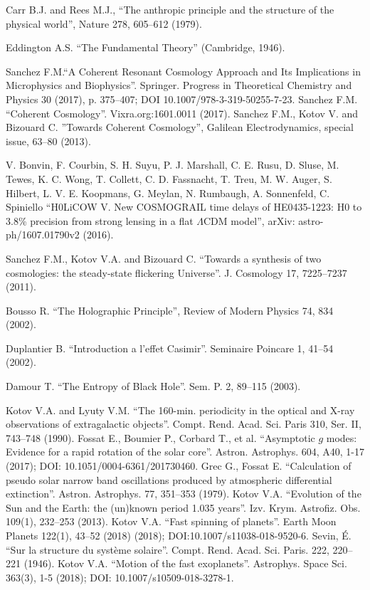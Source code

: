 \documentclass[twoside,draft]{article}
\begin{document}
\begin{sloppypar}
\begin{thebibliography}{99}\footnotesize

 Carr B.J. and Rees M.J., ``The anthropic principle and the
structure of the physical world'', Nature 278, 605--612 (1979).

 Eddington A.S. ``The Fundamental Theory'' (Cambridge, 1946).

 Sanchez F.M.``A Coherent Resonant Cosmology Approach and Its Implications in Microphysics and Biophysics''. Springer. Progress in Theoretical Chemistry and Physics 30 (2017), p. 375--407; DOI 10.1007/978-3-319-50255-7-23.  Sanchez F.M. ``Coherent Cosmology''. Vixra.org:1601.0011 (2017). Sanchez F.M., Kotov V. and Bizouard C. ''Towards Coherent Cosmology'', Galilean Electrodynamics, special issue, 63--80 (2013).

 V. Bonvin, F. Courbin, S. H. Suyu, P. J. Marshall, C. E. Rusu, D. Sluse, M. Tewes, K. C. Wong, T. Collett, C. D. Fassnacht, T. Treu, M. W. Auger, S. Hilbert, L. V. E. Koopmans, G. Meylan, N. Rumbaugh, A. Sonnenfeld, C. Spiniello ``H0LiCOW V. New COSMOGRAIL time delays of HE0435-1223: H0 to 3.8\% precision from strong lensing in a flat $\Lambda$CDM model'', arXiv: astro-ph/1607.01790v2 (2016).

 Sanchez F.M., Kotov V.A. and Bizouard C. ``Towards a synthesis of
two cosmologies: the steady-state flickering Universe''. J. Cosmology 17,
7225--7237 (2011).

 Bousso R. ``The Holographic Principle'', Review of Modern Physics
74, 834 (2002).

 Duplantier B. ``Introduction a l'effet Casimir''. Seminaire
Poincare 1, 41--54 (2002).

 Damour T. ``The Entropy of Black Hole''. Sem. P. 2, 89--115 (2003).

 Kotov V.A. and Lyuty V.M. ``The 160-min. periodicity in the optical
and X-ray observations of extragalactic objects''. Compt. Rend. Acad. Sci.
Paris 310, Ser. II, 743--748 (1990). Fossat E., Boumier P., Corbard T., et al.
``Asymptotic $g$ modes: Evidence for a rapid rotation of the solar core''.
Astron. Astrophys. 604, A40, 1-17 (2017); DOI: 10.1051/0004-6361/201730460.
Grec G., Fossat E. ``Calculation of pseudo solar narrow band oscillations
produced by atmospheric differential extinction''. Astron. Astrophys. 77,
351--353 (1979). Kotov V.A. ``Evolution of the Sun and the Earth: the (un)known
period 1.035 years''. Izv. Krym. Astrofiz. Obs. 109(1), 232--253 (2013).
Kotov V.A. ``Fast spinning of planets''. Earth Moon Planets 122(1), 43--52
(2018) (2018); DOI:10.1007/s11038-018-9520-6. Sevin, \'E. ``Sur la structure du
syst\`eme solaire''. Compt. Rend. Acad. Sci. Paris. 222, 220--221 (1946).
Kotov V.A. ``Motion of the fast exoplanets''. Astrophys. Space Sci. 363(3), 1-5
(2018); DOI: 10.1007/s10509-018-3278-1.


\end{thebibliography}
\end{sloppypar}
\end{document}
